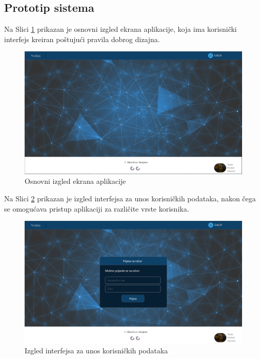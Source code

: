 \documentclass[12pt,a4paper]{article}
\begin{document}
\newpage

\subsection{Prototip sistema}

\quad Na Slici \ref{pt1} prikazan je osnovni izgled ekrana aplikacije, koja ima korisnički interfejs kreiran poštujući pravila dobrog  dizajna.

\begin{figure}[H]
\center
\includegraphics[scale=0.4]{../res/Prototype/Main.PNG}
\caption{Osnovni izgled ekrana aplikacije}
\label{pt1}
\end{figure}

Na Slici \ref{pt2} prikazan je izgled interfejsa za unos korisničkih podataka, nakon čega se omogućava pristup aplikaciji za različite vrste korisnika.

\begin{figure}[H]
\center
\includegraphics[scale=0.4]{../res/Prototype/LogIn.PNG}
\caption{Izgled interfejsa za unos korisničkih podataka}
\label{pt2}
\end{figure}
\end{document}

